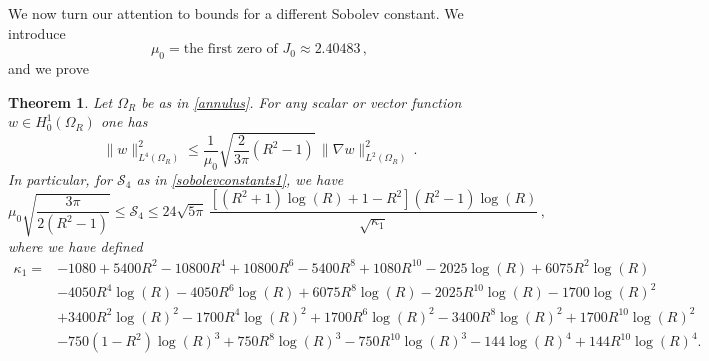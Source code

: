 \documentclass[a4paper,11pt]{article}
\newtheorem{theorem}{Theorem}[section]
\numberwithin{equation}{section}
\numberwithin{figure}{section}
\def\neweq#1{\begin{equation}\label{#1}}
\def\endeq{\end{equation}}
\begin{document}
We now turn our attention to bounds for a different Sobolev constant.
We introduce
\neweq{besselmu}
\mu_0=\mbox{the first zero of $J_0$}\approx2.40483\, ,
\endeq
and we prove

\begin{theorem}\label{boundsobolev}
Let $\Omega_R$ be as in \eqref{annulus}. For any scalar or vector function $w\in H^1_0(\Omega_{R})$ one has
	\neweq{ineqL4H1u2}
	\|w\|_{L^4(\Omega_{R})}^2 \leq \dfrac{1}{\mu_{0}} \sqrt{\dfrac{2}{3 \pi}(R^2 - 1)} \, \|\nabla w\|_{L^2(\Omega_{R})}^2\, .
	\endeq
In particular, for $\mathcal{S}_4$ as in \eqref{sobolevconstants1}, we have
\begin{equation} \label{lowerbound1}
\mu_{0} \sqrt{\dfrac{3 \pi}{2(R^2 - 1)}} \leq \mathcal{S}_4 \leq 24\sqrt{5 \pi} \, \dfrac{[(R^2 + 1)\log(R) + 1 - R^2](R^2 - 1)
\log(R)}{\sqrt{\kappa_{1}}} \, ,
\end{equation}
where we have defined
$$
\begin{aligned}
\kappa_{1} = & -1080 + 5400 R^2 - 10800 R^4 + 10800 R^6 - 5400 R^8 + 1080 R^{10} -
2025 \log(R) + 6075 R^2 \log(R) \\[3pt]
&  - 4050 R^4 \log(R) - 4050 R^6 \log(R) +
6075 R^8 \log(R) - 2025 R^{10} \log(R) - 1700 \log(R)^2  \\[3pt]
& + 3400 R^2 \log(R)^2 - 1700 R^4 \log(R)^2 + 1700 R^6 \log(R)^2 -
3400 R^8 \log(R)^2 + 1700 R^{10} \log(R)^2 \\[3pt]
& - 750 (1-R^2) \log(R)^3  + 750 R^8 \log(R)^3 - 750 R^{10} \log(R)^3 -
144 \log(R)^4 + 144 R^{10} \log(R)^4 .
\end{aligned}
$$
\end{theorem}
\noindent
\end{document}
